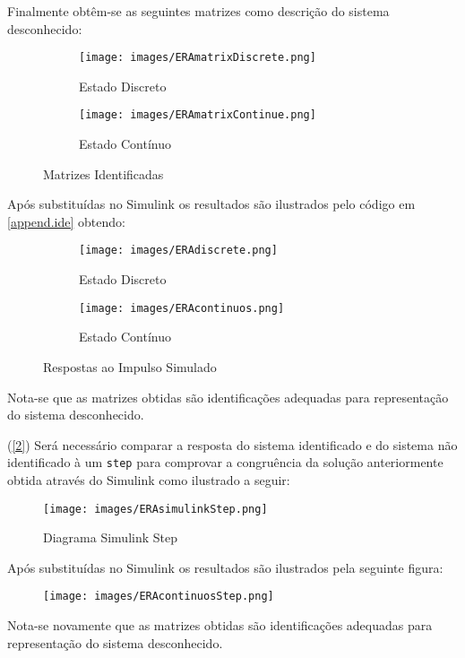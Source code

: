 \documentclass{article}
\begin{document}
\begin{resolution}
\newpage
        Finalmente obtêm-se as seguintes matrizes como descrição do sistema desconhecido:
        \begin{figure}[H]
            \centering
            \begin{subfigure}[H]{0.45\textwidth}
                \centering
                \texttt{[image: images/ERAmatrixDiscrete.png]}
                \caption{Estado Discreto}
            \end{subfigure}
            \begin{subfigure}[H]{0.45\textwidth}
                \centering
                \texttt{[image: images/ERAmatrixContinue.png]}
                \caption{Estado Contínuo}
            \end{subfigure}
            \caption{Matrizes Identificadas}
        \end{figure}
        Após substituídas no Simulink os resultados são ilustrados pelo código em \ref{append.ide} obtendo:
        \begin{figure}[H]
            \centering
            \begin{subfigure}[H]{0.45\textwidth}
                \centering
                \texttt{[image: images/ERAdiscrete.png]}
                \caption{Estado Discreto}
            \end{subfigure}
            \begin{subfigure}[H]{0.45\textwidth}
                \centering
                \texttt{[image: images/ERAcontinuos.png]}
                \caption{Estado Contínuo}
            \end{subfigure}
            \caption{Respostas ao Impulso Simulado}
        \end{figure}
        Nota-se que as matrizes obtidas são identificações adequadas para representação do sistema desconhecido.
    \end{resolution}
\newpage
    \begin{resolution}
        (\ref{2}) Será necessário comparar a resposta do sistema identificado e do sistema não identificado à um \texttt{step} para comprovar a congruência da solução anteriormente obtida através do Simulink como ilustrado a seguir:
        \begin{figure}[H]
            \centering
            \texttt{[image: images/ERAsimulinkStep.png]}
            \caption{Diagrama Simulink Step}
        \end{figure}
        Após substituídas no Simulink os resultados são ilustrados pela seguinte figura:
        \begin{figure}[H]
            \centering
            \texttt{[image: images/ERAcontinuosStep.png]}
        \end{figure}
        Nota-se novamente que as matrizes obtidas são identificações adequadas para representação do sistema desconhecido.
    \end{resolution}
\end{document}

